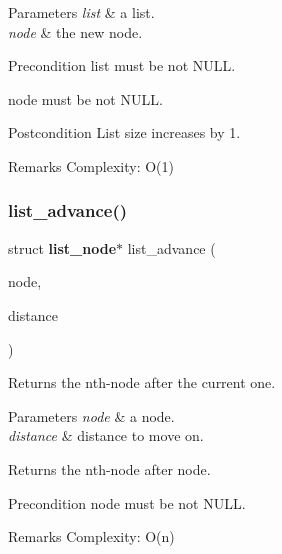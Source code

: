 \begin{DoxyParams}{Parameters}
{\em list} & a list. \\
\hline
{\em node} & the new node.\\
\hline
\end{DoxyParams}
\begin{DoxyPrecond}{Precondition}
{\ttfamily list} must be not N\+U\+LL. 

{\ttfamily node} must be not N\+U\+LL.
\end{DoxyPrecond}
\begin{DoxyPostcond}{Postcondition}
List size increases by 1.
\end{DoxyPostcond}
\begin{DoxyRemark}{Remarks}
Complexity\+: O(1) 
\end{DoxyRemark}
\mbox{\label{list_8h_a3e71507d9a07668a357907d4515336de}} 
\subsubsection{list\+\_\+advance()}
{\footnotesize\ttfamily struct \textbf{ list\+\_\+node}$\ast$ list\+\_\+advance (\begin{DoxyParamCaption}\item[{struct \textbf{ list\+\_\+node} $\ast$}]{node,  }\item[{size\+\_\+t}]{distance }\end{DoxyParamCaption})}

Returns the nth-\/node after the current one.


\begin{DoxyParams}{Parameters}
{\em node} & a node. \\
\hline
{\em distance} & distance to move on. \\
\hline
\end{DoxyParams}
\begin{DoxyReturn}{Returns}
the nth-\/node after {\ttfamily node}.
\end{DoxyReturn}
\begin{DoxyPrecond}{Precondition}
{\ttfamily node} must be not N\+U\+LL.
\end{DoxyPrecond}
\begin{DoxyRemark}{Remarks}
Complexity\+: O(n) 
\end{DoxyRemark}
\mbox{\label{list_8h_a40638777b5f341c88e8b09acf75fb8c9}} 
